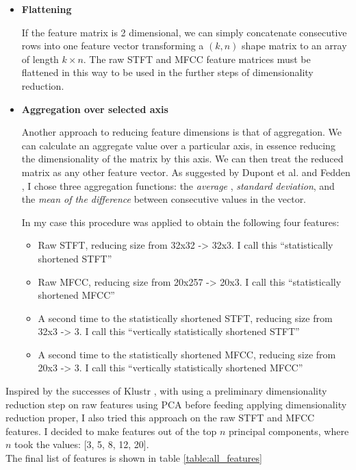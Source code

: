 \documentclass[a4paper, 12pt, twoside]{report}
\begin{document}
\begin{itemize}
\item \textbf{ Flattening }

If the feature matrix is 2 dimensional, we can simply concatenate consecutive rows into one feature vector transforming a \((k,n)\) shape matrix to an array of length \(k \times n\). The raw STFT and MFCC feature matrices must be flattened in this way to be used in the further steps of dimensionality reduction.

\item \textbf{ Aggregation over selected axis }

Another approach to reducing feature dimensions is that of aggregation. We can calculate an aggregate value over a particular axis, in essence reducing the dimensionality of the matrix by this axis. We can then treat the reduced matrix as any other feature vector. As suggested by Dupont et al. \cite{Dupont_2013} and Fedden \cite{medium}, I chose three aggregation functions: the \textit{ average }, \textit{standard deviation}, and the \textit{mean of the difference} between consecutive values in the vector.

In my case this procedure was applied to obtain the following four features:
\begin{itemize}
\item Raw STFT, reducing size from 32x32 -> 32x3. I call this ``statistically shortened STFT''
\item Raw MFCC, reducing size from 20x257 -> 20x3. I call this ``statistically shortened MFCC''
\item A second time to the statistically shortened STFT, reducing size from 32x3 -> 3. I call this ``vertically statistically shortened STFT''
\item A second time to the statistically shortened MFCC, reducing size from 20x3 -> 3. I call this ``vertically statistically shortened MFCC''
\end{itemize}
\end{itemize}

Inspired by the successes of Klustr \cite{klustr}, with using a preliminary dimensionality reduction step on raw features using PCA before feeding applying dimensionality reduction proper, I also tried this approach on the raw STFT and MFCC features. I decided to make features out of the top $n$ principal components, where $n$ took the values: [3, 5, 8, 12, 20].
\\
The final list of features is shown in table \ref{table:all_features}
\end{document}
